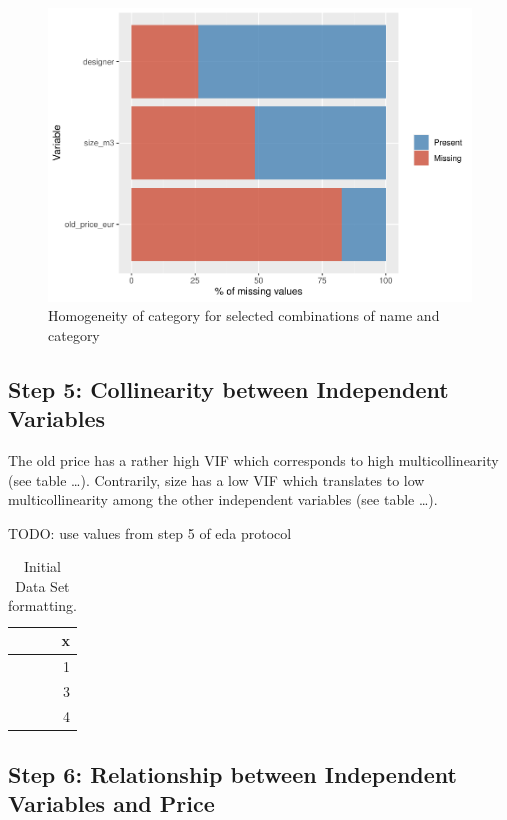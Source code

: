 \documentclass[a4paper, nobind]{templates/ociamthesis}
\begin{document}
\begin{figure}
\includegraphics[width=1\linewidth]{_main_files/figure-latex/missing-values-1} \caption{Homogeneity of category for selected combinations of name and category}\label{fig:missing-values}
\end{figure}

\hypertarget{step-5-collinearity-between-independent-variables}{%
\subsection{Step 5: Collinearity between Independent Variables}\label{step-5-collinearity-between-independent-variables}}

The old price has a rather high VIF which corresponds to high multicollinearity (see table \ldots{}). Contrarily, size has a low VIF which translates to low multicollinearity among the other independent variables (see table \ldots{}).

TODO: use values from step 5 of eda protocol

\begin{table}

\caption{\label{tab:initial-ikea2}Initial Data Set formatting.}
\centering
\begin{tabular}[t]{r}
\hline
x\\
\hline
1\\
\hline
3\\
\hline
4\\
\hline
\end{tabular}
\end{table}

\hypertarget{relationship}{%
\subsection{Step 6: Relationship between Independent Variables and Price}\label{relationship}}
\end{document}
